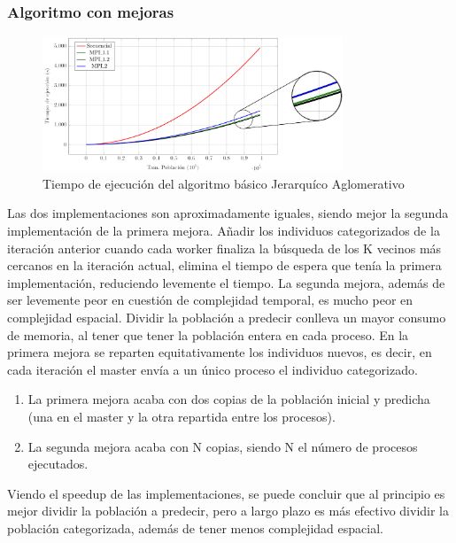 		\subsubsection{Algoritmo con mejoras}


			\begin{figure}[!h]
				\centering
				\includegraphics[width=0.8\textwidth]{images/chapter_4/knn_mpi}
				\caption{Tiempo de ejecución del algoritmo básico Jerarquíco Aglomerativo}
				\label{fig:example}
			\end{figure}
			
			Las dos implementaciones son aproximadamente iguales, siendo mejor la segunda implementación de la primera mejora. Añadir los individuos categorizados de la iteración anterior cuando cada worker finaliza la búsqueda de los K vecinos más cercanos en la iteración actual, elimina el tiempo de espera que tenía la primera implementación, reduciendo levemente el tiempo.
			La segunda mejora, además de ser levemente peor en cuestión de complejidad temporal, es mucho peor en complejidad espacial. Dividir la población a predecir conlleva un mayor consumo de memoria, al tener que tener la población entera en cada proceso. En la primera mejora se reparten equitativamente los individuos nuevos, es decir, en cada iteración el master envía a un único proceso el individuo categorizado.
			
			
			\begin{enumerate}
				\item La primera mejora acaba con dos copias de la población inicial y predicha (una en el master y la otra repartida entre los procesos).
				\item La segunda mejora acaba con N copias, siendo N el número de procesos ejecutados.
			\end{enumerate}
		

			Viendo el speedup de las implementaciones, se puede concluir que al principio es mejor dividir la población a predecir, pero a largo plazo es más efectivo dividir la población categorizada, además de tener menos complejidad espacial. 
		
